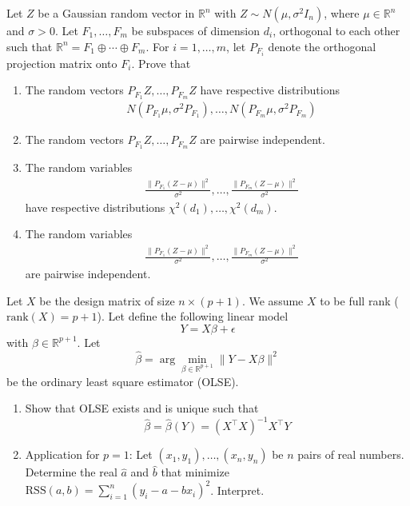 
\begin{exercise}
Let \(Z\) be a Gaussian random vector in \(\mathbb{R}^n\) with \(Z \sim N(\mu, \sigma^2 I_n)\), where \(\mu \in \mathbb{R}^n\) and \(\sigma > 0\). Let \(F_1, \ldots, F_m\) be subspaces of dimension \(d_i\), orthogonal to each other such that \(\mathbb{R}^n = F_1 \oplus \cdots \oplus F_m\). For \(i = 1, \ldots, m\), let \(P_{F_i}\) denote the orthogonal projection matrix onto \(F_i\). Prove that

\begin{enumerate}
    \item The random vectors \(P_{F_1}Z, \ldots, P_{F_m}Z\) have respective distributions
    \begin{align}
        &N(P_{F_1}\mu, \sigma^2 P_{F_1}), \ldots, N(P_{F_m}\mu, \sigma^2 P_{F_m})
    \end{align}

    \item The random vectors \(P_{F_1}Z, \ldots, P_{F_m}Z\) are pairwise independent.

    \item The random variables
    \begin{align}
        &\frac{\|P_{F_1}(Z-\mu)\|^2}{\sigma^2}, \ldots, \frac{\|P_{F_m}(Z-\mu)\|^2}{\sigma^2}
    \end{align}
    have respective distributions \(\chi^2(d_1), \ldots, \chi^2(d_m)\).

    \item The random variables 
    \begin{align}
        &\frac{\|P_{F_1}(Z-\mu)\|^2}{\sigma^2}, \ldots, \frac{\|P_{F_m}(Z-\mu)\|^2}{\sigma^2}
    \end{align}
    are pairwise independent.
\end{enumerate}
\end{exercise}

\begin{exercise}
Let \(X\) be the design matrix of size \(n \times (p + 1)\). We assume \(X\) to be full rank (\(\text{rank}(X) = p + 1\)). Let define the following linear model
\[Y = X\beta + \epsilon\]
with \(\beta \in \mathbb{R}^{p+1}\). Let
\[\hat{\beta} = \arg \min_{\beta \in \mathbb{R}^{p+1}} \|Y - X\beta\|^2\]
be the ordinary least square estimator (OLSE).

\begin{enumerate}
    \item Show that OLSE exists and is unique such that
    \[\hat{\beta} = \hat{\beta}(Y) = (X^{\top}X)^{-1}X^{\top}Y\]

    \item Application for \(p = 1\): Let \((x_1, y_1), \ldots, (x_n, y_n)\) be \(n\) pairs of real numbers. Determine the real \(\hat{a}\) and \(\hat{b}\) that minimize \(\text{RSS}(a, b) = \sum_{i=1}^n (y_i - a - bx_i)^2\). Interpret.
\end{enumerate}
\end{exercise}

